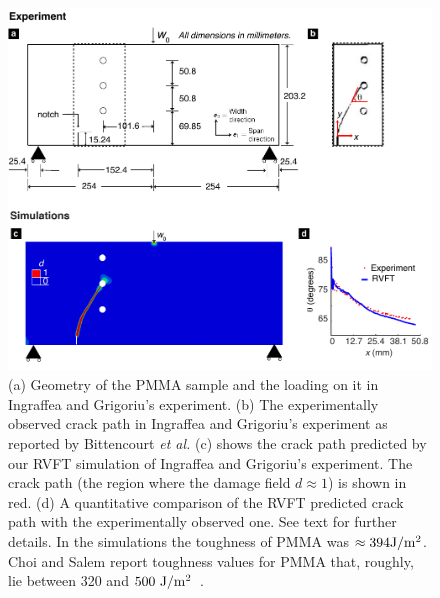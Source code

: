 \documentclass[11pt,letterpaper]{report}
\begin{document}
\begin{enumerate}[label=\textit{2.\arabic*},wide, labelwidth=!, labelindent=0pt]
\begin{figure}[hb!]
	\centering
	\includegraphics[width=\textwidth]{./Figures/Fig2_ver6.pdf}
	\caption{ (a) Geometry  of the PMMA sample and the loading on it in Ingraffea and Grigoriu's  experiment. %
	(b) The experimentally observed crack path in  Ingraffea and Grigoriu's  experiment as reported by Bittencourt  \textit{et al.}\cite{bittencourt1996quasi} %
	(c) shows the crack path predicted by our RVFT simulation of Ingraffea and Grigoriu's  experiment. %
	The crack path (the region where the damage field $d \approx 1$) is shown in red. %
	(d) A quantitative comparison of the RVFT predicted crack path with the experimentally observed one. %
	See text for further details. %
	In the simulations the toughness of PMMA was $\approx 394 \rm J/m^2$. %
	Choi and Salem report toughness values for  PMMA that, roughly, lie between 320 and $500~\rm J/m^2$~\cite{choi1993fracture}.}
	\label{fig:ThreeHoles}
\end{figure}


\end{enumerate}
\end{document}
